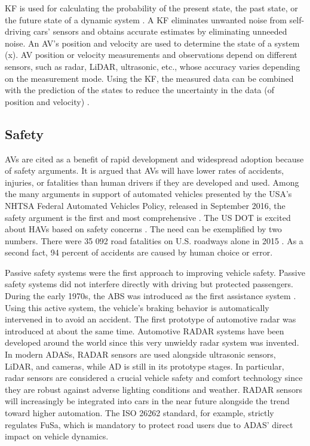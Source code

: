 \documentclass[a4paper,12pt]{article}
\begin{document}
\begin{itemize}
\hspace{5mm} KF is used for calculating the probability of the present state, the past state, or the future state of a dynamic system \cite{article24}. A KF eliminates unwanted noise from self-driving cars' sensors and obtains accurate estimates by eliminating unneeded noise. An AV's position and velocity are used to determine the state of a system (x). AV position or velocity measurements and observations depend on different sensors, such as radar, LiDAR, ultrasonic, etc., whose accuracy varies depending on the measurement mode. Using the KF, the measured data can be combined with the prediction of the states to reduce the uncertainty in the data (of position and velocity) \cite{article24}.

\end{itemize}

\subsection{Safety}

\hspace{5mm} AVs are cited as a benefit of rapid development and widespread adoption because of safety arguments. It is argued that AVs will have lower rates of accidents, injuries, or fatalities than human drivers if they are developed and used. Among the many arguments in support of automated vehicles presented by the USA's NHTSA Federal Automated Vehicles Policy, released in September 2016, the safety argument is the first and most comprehensive \cite{article35}. The US DOT is excited about HAVs based on safety concerns \cite{article35}. The need can be exemplified by two numbers. There were 35 092 road fatalities on U.S. roadways alone in 2015 \cite{article35}. As a second fact, 94 percent of accidents are caused by human choice or error.

\hspace{5mm} Passive safety systems were the first approach to improving vehicle safety. Passive safety systems did not interfere directly with driving but protected passengers. During the early 1970s, the ABS was introduced as the first assistance system \cite{article33}. Using this active system, the vehicle's braking behavior is automatically intervened in to avoid an accident. The first prototype of automotive radar was introduced at about the same time. Automotive RADAR systems have been developed around the world since this very unwieldy radar system was invented. In modern ADASs, RADAR sensors are used alongside ultrasonic sensors, LiDAR, and cameras, while AD is still in its prototype stages. In particular, radar sensors are considered a crucial vehicle safety and comfort technology since they are robust against adverse lighting conditions and weather. RADAR sensors will increasingly be integrated into cars in the near future alongside the trend toward higher automation. The ISO 26262 standard, for example, strictly regulates FuSa, which is mandatory to protect road users due to ADAS' direct impact on vehicle dynamics.
\end{document}
